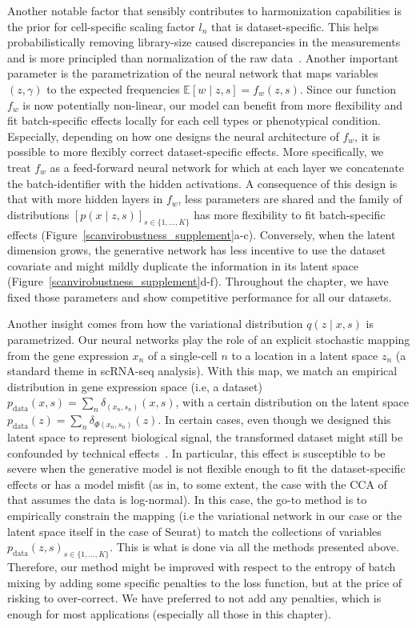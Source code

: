 Another notable factor that sensibly contributes to harmonization capabilities is the prior for cell-specific scaling factor $l_n$ that is dataset-specific. This helps probabilistically removing library-size caused discrepancies in the measurements and is more principled than normalization of the raw data~\cite{vallejos2017norm}. Another important parameter is the parametrization of the neural network that maps variables $(z, \gamma)$ to the expected frequencies $\mathbb{E}[w \mid z, s] = f_w(z, s)$. Since our function $f_w$ is now potentially non-linear, our model can benefit from more flexibility and fit batch-specific effects locally for each cell types or phenotypical condition. Especially, depending on how one designs the neural architecture of $f_w$, it is possible to more flexibly correct dataset-specific effects. More specifically, we treat $f_w$ as a feed-forward neural network for which at each layer we concatenate the batch-identifier with the hidden activations. A consequence of this design is that with more hidden layers in $f_w$, less parameters are shared and the family of distributions $\left[p(x \mid z, s)\right]_{s \in \{1, \ldots, K\}}$ has more flexibility to fit batch-specific effects (Figure~\ref{scanvirobustness_supplement}a-c). Conversely, when the latent dimension grows, the generative network has less incentive to use the dataset covariate and might mildly duplicate the information in its latent space (Figure~\ref{scanvirobustness_supplement}d-f). Throughout the chapter, we have fixed those parameters and show competitive performance for all our datasets.

Another insight comes from how the variational distribution $q(z \mid x, s)$ is parametrized. Our neural networks play the role of an explicit stochastic mapping from the gene expression $x_n$ of a single-cell $n$ to a location in a latent space $z_n$ (a standard theme in scRNA-seq analysis). With this map, we match an empirical distribution in gene expression space (i.e, a dataset) $p_{\text{data}}(x, s) = \sum_n \delta_{(x_n, s_n)}(x, s)$, with a certain distribution on the latent space $p_{\text{data}}(z) = \sum_n \delta_{\Phi(x_n, s_n)}(z)$. In certain cases, even though we designed this latent space to represent biological signal, the transformed dataset might still be confounded by technical effects~\cite{HCV}. In particular, this effect is susceptible to be severe when the generative model is not flexible enough to fit the dataset-specific effects or has a model misfit (as in, to some extent, the case with the CCA of~\cite{seurat} that assumes the data is log-normal). In this case, the go-to method is to empirically constrain the mapping (i.e the variational network in our case or the latent space itself in the case of Seurat) to match the collections of variables $p_{\text{data}}(z, s)_{s \in \{1, \ldots, K\}}$. This is what is done via all the methods presented above. Therefore, our method might be improved with respect to the entropy of batch mixing by adding some specific penalties to the loss function, but at the price of risking to over-correct. We have preferred to not add any penalties, which is enough for most applications (especially all those in this chapter). 



